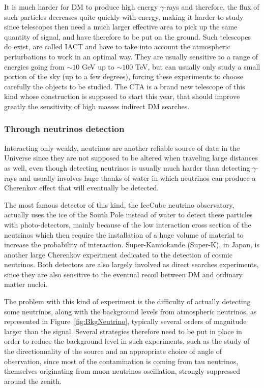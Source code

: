 \documentclass[a4paper, 10pt, openright]{report}
\begin{document}
It is much harder for \ac{DM} to produce high energy $\gamma$-rays and therefore, the flux of such particles decreases quite quickly with energy, making it harder to study since telescopes then need a much larger effective area to pick up the same quantity of signal, and have therefore to be put on the ground. Such telescopes do exist, are called \ac{IACT} and have to take into account the atmospheric perturbations to work in an optimal way. They are usually sensitive to a range of energies going from $\sim 10$ GeV up to $\sim 100$ TeV, but can usually only study a small portion of the sky (up to a few degrees), forcing these experiments to choose carefully the objects to be studied. The \ac{CTA} is a brand new telescope of this kind whose construction is supposed to start this year, that should improve greatly the sensitivity of high masses indirect \ac{DM} searches.

\subsubsection*{Through neutrinos detection}
Interacting only weakly, neutrinos are another reliable source of data in the Universe since they are not supposed to be altered when traveling large distances as well, even though detecting neutrinos is usually much harder than detecting $\gamma$-rays and usually involves huge thanks of water in which neutrinos can produce a Cherenkov effect that will eventually be detected.

The most famous detector of this kind, the IceCube neutrino observatory, actually uses the ice of the South Pole instead of water to detect these particles with photo-detectors, mainly because of the low interaction cross section of the neutrinos which then require the installation of a huge volume of material to increase the probability of interaction. Super-Kamiokande (Super-K), in Japan, is another large Cherenkov experiment dedicated to the detection of cosmic neutrinos. Both detectors are also largely involved as direct searches experiments, since they are also sensitive to the eventual recoil between \ac{DM} and ordinary matter nuclei.

The problem with this kind of experiment is the difficulty of actually detecting some neutrinos, along with the background levels from atmospheric neutrinos, as represented in Figure~\ref{fig:BkgNeutrino}, typically several orders of magnitude larger than the signal. Several strategies therefore need to be put in place in order to reduce the background level in such experiments, such as the study of the directionnality of the source and an appropriate choice of angle of observation, since most of the contamination is coming from tau neutrinos, themselves originating from muon neutrinos oscillation, strongly suppressed around the zenith.
\end{document}
